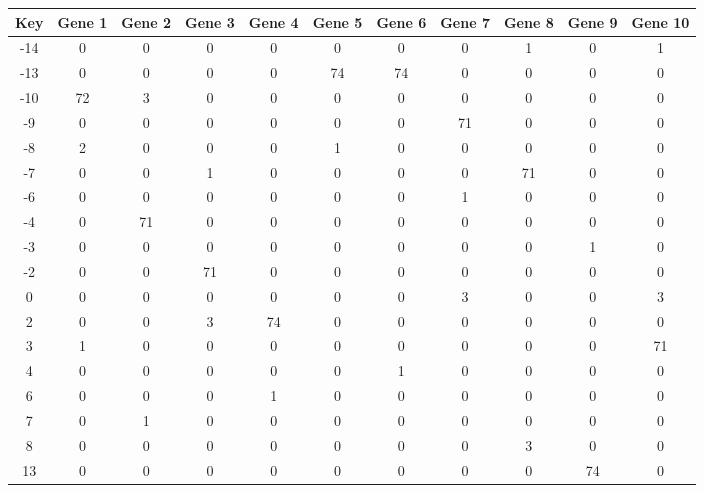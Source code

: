 \begin{tabular}{|c|c|c|c|c|c|c|c|c|c|c|}
\hline
Key & Gene 1 & Gene 2 & Gene 3 & Gene 4 & Gene 5 & Gene 6 & Gene 7 & Gene 8 & Gene 9 & Gene 10 \\
\hline
-14 & 0 & 0 & 0 & 0 & 0 & 0 & 0 & 1 & 0 & 1 \\
-13 & 0 & 0 & 0 & 0 & 74 & 74 & 0 & 0 & 0 & 0 \\
-10 & 72 & 3 & 0 & 0 & 0 & 0 & 0 & 0 & 0 & 0 \\
-9 & 0 & 0 & 0 & 0 & 0 & 0 & 71 & 0 & 0 & 0 \\
-8 & 2 & 0 & 0 & 0 & 1 & 0 & 0 & 0 & 0 & 0 \\
-7 & 0 & 0 & 1 & 0 & 0 & 0 & 0 & 71 & 0 & 0 \\
-6 & 0 & 0 & 0 & 0 & 0 & 0 & 1 & 0 & 0 & 0 \\
-4 & 0 & 71 & 0 & 0 & 0 & 0 & 0 & 0 & 0 & 0 \\
-3 & 0 & 0 & 0 & 0 & 0 & 0 & 0 & 0 & 1 & 0 \\
-2 & 0 & 0 & 71 & 0 & 0 & 0 & 0 & 0 & 0 & 0 \\
0 & 0 & 0 & 0 & 0 & 0 & 0 & 3 & 0 & 0 & 3 \\
2 & 0 & 0 & 3 & 74 & 0 & 0 & 0 & 0 & 0 & 0 \\
3 & 1 & 0 & 0 & 0 & 0 & 0 & 0 & 0 & 0 & 71 \\
4 & 0 & 0 & 0 & 0 & 0 & 1 & 0 & 0 & 0 & 0 \\
6 & 0 & 0 & 0 & 1 & 0 & 0 & 0 & 0 & 0 & 0 \\
7 & 0 & 1 & 0 & 0 & 0 & 0 & 0 & 0 & 0 & 0 \\
8 & 0 & 0 & 0 & 0 & 0 & 0 & 0 & 3 & 0 & 0 \\
13 & 0 & 0 & 0 & 0 & 0 & 0 & 0 & 0 & 74 & 0 \\
\hline
\end{tabular}